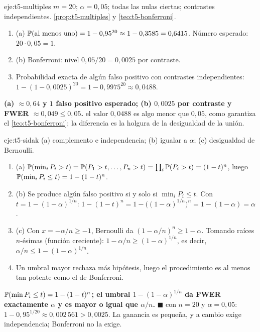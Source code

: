 \begin{solucion}{eje:t5-multiples}
\datos $m=20$; $\alpha=0{,}05$; todas las nulas ciertas; contrastes independientes.
\planteamiento \cref{prop:t5-multiples} y \cref{teo:t5-bonferroni}.
\pasos
\begin{enumerate}[label=\arabic*.]
  \item (a) $\mathbb{P}(\text{al menos uno})=1-0{,}95^{20}\approx1-0{,}3585=0{,}6415$. Número esperado: $20\cdot0{,}05=1$.
  \item (b) Bonferroni: nivel $0{,}05/20=0{,}0025$ por contraste.
  \item Probabilidad exacta de algún falso positivo con contrastes independientes: $1-(1-0{,}0025)^{20}=1-0{,}9975^{20}\approx0{,}0488$.
\end{enumerate}
\resultado \textbf{(a) $\approx0{,}64$ y $1$ falso positivo esperado; (b) $0{,}0025$ por contraste y FWER $\approx0{,}049\le0{,}05$.}
\comprobacion el valor $0{,}0488$ es algo menor que $0{,}05$, como garantiza el \cref{teo:t5-bonferroni}; la diferencia es la holgura de la desigualdad de la unión.
\end{solucion}

\begin{solucion}{eje:t5-sidak}
\planteamiento (a) complemento e independencia; (b) igualar a $\alpha$; (c) desigualdad de Bernoulli.
\pasos
\begin{enumerate}[label=\arabic*.]
  \item (a) $\mathbb{P}(\min_iP_i>t)=\mathbb{P}(P_1>t,\dots,P_n>t)=\prod_i\mathbb{P}(P_i>t)=(1-t)^{n}$, luego $\mathbb{P}(\min_iP_i\le t)=1-(1-t)^{n}$.
  \item (b) Se produce algún falso positivo si y solo si $\min_iP_i\le t$. Con $t=1-(1-\alpha)^{1/n}$: $1-(1-t)^{n}=1-\bigl((1-\alpha)^{1/n}\bigr)^{n}=1-(1-\alpha)=\alpha$.
  \item (c) Con $x=-\alpha/n\ge-1$, Bernoulli da $(1-\alpha/n)^{n}\ge1-\alpha$. Tomando raíces $n$-ésimas (función creciente): $1-\alpha/n\ge(1-\alpha)^{1/n}$, es decir, $\alpha/n\le1-(1-\alpha)^{1/n}$.
  \item Un umbral mayor rechaza más hipótesis, luego el procedimiento es al menos tan potente como el de Bonferroni.
\end{enumerate}
\resultado \textbf{$\mathbb{P}(\min P_i\le t)=1-(1-t)^{n}$; el umbral $1-(1-\alpha)^{1/n}$ da FWER exactamente $\alpha$ y es mayor o igual que $\alpha/n$.} $\blacksquare$
\comprobacion con $n=20$ y $\alpha=0{,}05$: $1-0{,}95^{1/20}\approx0{,}002\,561>0{,}0025$. La ganancia es pequeña, y a cambio exige independencia; Bonferroni no la exige.
\end{solucion}

